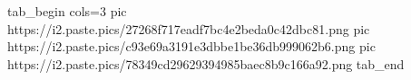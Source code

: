 
 
 
 
 

\ifcmt
  tab_begin cols=3
     pic https://i2.paste.pics/27268f717eadf7bc4e2beda0c42dbc81.png
     pic https://i2.paste.pics/c93e69a3191e3dbbe1be36db999062b6.png
     pic https://i2.paste.pics/78349cd29629394985baec8b9c166a92.png
  tab_end
\fi
